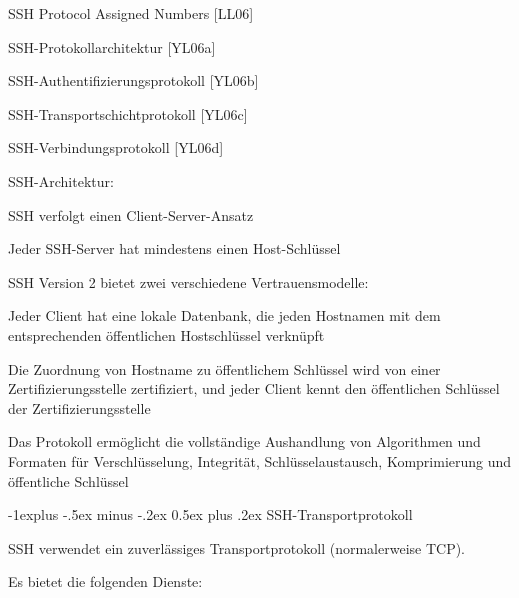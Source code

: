 \documentclass[a4paper]{article}
\makeatletter
\renewcommand{\subsection}{\@startsection{subsection}{2}{0mm}%
 {-1explus -.5ex minus -.2ex}%
 {0.5ex plus .2ex}%
 {\normalfont\normalsize\bfseries}}
\makeatother
\begin{document}
\begin{multicols}{3}
\begin{itemize*}
\begin{itemize*}
                  \begin{itemize*}
                        \item SSH Protocol Assigned Numbers {[}LL06{]}
                        \item SSH-Protokollarchitektur {[}YL06a{]}
                        \item SSH-Authentifizierungsprotokoll {[}YL06b{]}
                        \item SSH-Transportschichtprotokoll {[}YL06c{]}
                        \item SSH-Verbindungsprotokoll {[}YL06d{]}
                  \end{itemize*}
                  \item
                  SSH-Architektur:

                  \begin{itemize*}
                        \item SSH verfolgt einen Client-Server-Ansatz
                        \item Jeder SSH-Server hat mindestens einen Host-Schlüssel
                        \item SSH Version 2 bietet zwei verschiedene Vertrauensmodelle:
                        \begin{itemize*} \item Jeder Client hat eine lokale Datenbank, die jeden Hostnamen mit dem entsprechenden öffentlichen Hostschlüssel verknüpft \item Die Zuordnung von Hostname zu öffentlichem Schlüssel wird von einer Zertifizierungsstelle zertifiziert, und jeder Client kennt den öffentlichen Schlüssel der Zertifizierungsstelle \end{itemize*}
                        \item Das Protokoll ermöglicht die vollständige Aushandlung von Algorithmen und Formaten für Verschlüsselung, Integrität, Schlüsselaustausch, Komprimierung und öffentliche Schlüssel
                  \end{itemize*}
            \end{itemize*}


            \subsection{SSH-Transportprotokoll}

            \begin{itemize*}
                  \item
                  SSH verwendet ein zuverlässiges Transportprotokoll (normalerweise
                  TCP).
                  \item
                  Es bietet die folgenden Dienste:


\end{itemize*}
\end{itemize*}
\end{multicols}
\end{document}
